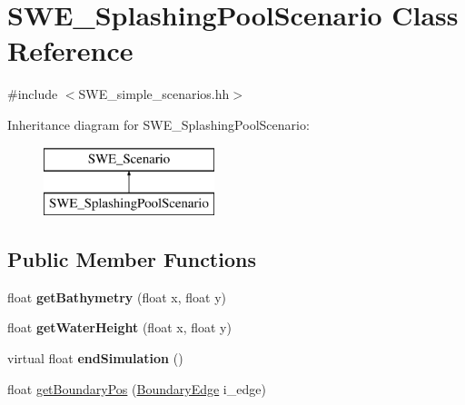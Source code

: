 \hypertarget{classSWE__SplashingPoolScenario}{\section{S\-W\-E\-\_\-\-Splashing\-Pool\-Scenario Class Reference}
\label{classSWE__SplashingPoolScenario}
}


{\ttfamily \#include $<$S\-W\-E\-\_\-simple\-\_\-scenarios.\-hh$>$}

Inheritance diagram for S\-W\-E\-\_\-\-Splashing\-Pool\-Scenario\-:\begin{figure}[H]
\begin{center}
\leavevmode
\includegraphics[height=2.000000cm]{classSWE__SplashingPoolScenario}
\end{center}
\end{figure}
\subsection*{Public Member Functions}
\begin{DoxyCompactItemize}
\item 
\hypertarget{classSWE__SplashingPoolScenario_a75c48073eb863d52fe38639ff0834e72}{float {\bfseries get\-Bathymetry} (float x, float y)}\label{classSWE__SplashingPoolScenario_a75c48073eb863d52fe38639ff0834e72}

\item 
\hypertarget{classSWE__SplashingPoolScenario_a45328d2cbff3068f6bde34d92dff0d1c}{float {\bfseries get\-Water\-Height} (float x, float y)}\label{classSWE__SplashingPoolScenario_a45328d2cbff3068f6bde34d92dff0d1c}

\item 
\hypertarget{classSWE__SplashingPoolScenario_a49edaef6fbfad67c12f0ce1942e9f848}{virtual float {\bfseries end\-Simulation} ()}\label{classSWE__SplashingPoolScenario_a49edaef6fbfad67c12f0ce1942e9f848}

\item 
float \hyperlink{classSWE__SplashingPoolScenario_af9ca3bce236a98e2a7ee5165088c8ed6}{get\-Boundary\-Pos} (\hyperlink{SWE__Scenario_8hh_aa5e01e3f7df312f7b9b0d02521141fcc}{Boundary\-Edge} i\-\_\-edge)
\end{DoxyCompactItemize}
